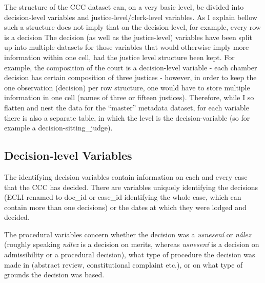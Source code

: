 \documentclass[
  11pt,
]{article}
\begin{document}
The structure of the CCC dataset can, on a very basic level, be divided
into decision-level variables and justice-level/clerk-level variables.
As I explain bellow such a structure does not imply that on the
decision-level, for example, every row is a decision The decision (as
well as the justice-level) variables have been split up into multiple
datasets for those variables that would otherwise imply more information
within one cell, had the justice level structure been kept. For example,
the composition of the court is a decision-level variable - each chamber
decision has certain composition of three justices - however, in order
to keep the one observation (decision) per row structure, one would have
to store multiple information in one cell (names of three or fifteen
justices). Therefore, while I so flatten and nest the data for the
``master'' metadata dataset, for each variable there is also a separate
table, in which the level is the decision-variable (so for example a
decision-sitting\_judge).

\hypertarget{decision-level-variables}{%
\subsection{Decision-level Variables}\label{decision-level-variables}}

The identifying decision variables contain information on each and every
case that the CCC has decided. There are variables uniquely identifying
the decisions (ECLI renamed to doc\_id or case\_id identifying the whole
case, which can contain more than one decisions) or the dates at which
they were lodged and decided.

The procedural variables concern whether the decision was a
\emph{usnesení} or \emph{nález} (roughly speaking \emph{nález} is a
decision on merits, whereas \emph{usnesení} is a decision on
admissibility or a procedural decision), what type of procedure the
decision was made in (abstract review, constitutional complaint etc.),
or on what type of grounds the decision was based.
\end{document}
